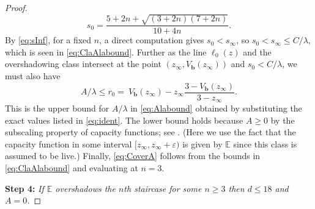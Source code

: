 \documentclass[11pt, reqno]{amsart}
\theoremstyle{remark}
\numberwithin{equation}{subsection}
\numberwithin{figure}{section}
\theoremstyle{customremark}
\newcommand{\NI}{{\noindent}}
\newcommand{\bE}{{\mathbb E}}
\newcommand{\la}{{\lambda}}
\newcommand{\MS}{{\medskip}}
\newcommand{\eps}{\varepsilon}
\begin{document}
\begin{proof}
 \[ s_0= \frac{5+2n+\sqrt{(3+2n)(7+2n)}}{10+4n}.\] 
 By \eqref{eq:sInf}, for a fixed $n$, a direct computation gives $s_0 < s_\infty$, so $s_0 < s_\infty \leq C/\la$, which is seen in \eqref{eq:ClaAlabound}.
Further as the line $\ell_0(z)$ and the overshadowing class intersect at the point $(z_\infty,V_{\bm b}(z_\infty))$ and $s_0<C/\la$, we must also have 
\[ A/\la \leq r_0=\ V_{\bm{b}}(z_\infty)-z_\infty\frac{3-V_{\bm{b}}(z_\infty)}{3-z_\infty}.\] This is the upper bound for $A/\la$ in \eqref{eq:Alabound} obtained by substituting the exact values listed in  \eqref{eq:ident}. The lower bound holds because $A\ge 0$ by the subscaling property of capacity functions; see \cite[Lem.1.1.1]{ball}. (Here we use the fact that the capacity function in some interval $[z_\infty,z_\infty + \eps)$ is given by $\bE$ since this class is assumed to be live.) 
 Finally, \eqref{eq:CoverA} follows from  the bounds in \eqref{eq:ClaAlabound} and evaluating at $n = 3$. 





\MS\MS

\NI {\bf Step 4:} {\it  If $\bE$ overshadows the $n$th staircase for some $n\ge 3$ then $d\le 18$ and $A = 0$.}
\MS


\end{proof}
\end{document}
